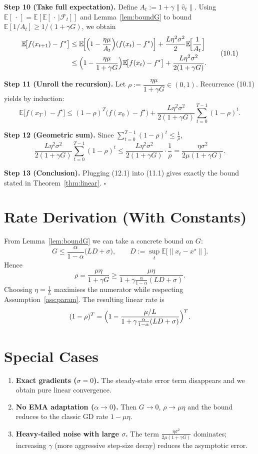 \documentclass{article}
\newcommand{\E}{\mathbb{E}}
\begin{document}
\noindent\textbf{Step 10 (Take full expectation).}  
Define $A_{t}:=1+\gamma\|\widehat v_{t}\|$. Using $\E[\,\cdot\,]=\E[\E[\,\cdot\,|\mathcal{F}_{t}]]$ and Lemma~\ref{lem:boundG} to bound $\E[1/A_{t}]\ge 1/(1+\gamma G)$, we obtain
\[
\begin{aligned}
    \E\!\bigl[f(x_{t+1})-f^{\star}\bigr]
    &\le \E\!\Bigl[\Bigl(1-\frac{\eta\mu}{A_{t}}\Bigr)(f(x_{t})-f^{\star})\Bigr]
        +\frac{L\eta^{2}\sigma^{2}}{2}\E\!\Bigl[\frac{1}{A_{t}}\Bigr]\\
    &\le \Bigl(1-\frac{\eta\mu}{1+\gamma G}\Bigr)\E\!\bigl[f(x_{t})-f^{\star}\bigr]
        +\frac{L\eta^{2}\sigma^{2}}{2(1+\gamma G)} .
\end{aligned}
\tag{10.1}
\]

\noindent\textbf{Step 11 (Unroll the recursion).}  
Let $\rho:=\dfrac{\eta\mu}{1+\gamma G}\in(0,1)$. Recurrence (10.1) yields by induction:
\[
    \E\!\bigl[f(x_{T})-f^{\star}\bigr]
    \le (1-\rho)^{T}\bigl(f(x_{0})-f^{\star}\bigr)
        +\frac{L\eta^{2}\sigma^{2}}{2(1+\gamma G)}\sum_{t=0}^{T-1}(1-\rho)^{t}.
\tag{11.1}
\]

\noindent\textbf{Step 12 (Geometric sum).}  
Since $\sum_{t=0}^{T-1}(1-\rho)^{t}\le \frac{1}{\rho}$,
\[
    \frac{L\eta^{2}\sigma^{2}}{2(1+\gamma G)}\sum_{t=0}^{T-1}(1-\rho)^{t}
    \le \frac{L\eta^{2}\sigma^{2}}{2(1+\gamma G)}\cdot\frac{1}{\rho}
    =\frac{\eta\sigma^{2}}{2\mu(1+\gamma G)} .
\tag{12.1}
\]

\noindent\textbf{Step 13 (Conclusion).}  
Plugging (12.1) into (11.1) gives exactly the bound stated in Theorem~\ref{thm:linear}. $\square$

\section*{Rate Derivation (With Constants)}
From Lemma~\ref{lem:boundG} we can take a concrete bound on $G$:
\[
    G\le \frac{\alpha}{1-\alpha}\bigl(LD+\sigma\bigr),\qquad
    D:=\sup_{t}\E\!\bigl[\|x_{t}-x^{\star}\|\bigr].
\]
Hence
\[
    \rho = \frac{\mu\eta}{1+\gamma G}
    \ge \frac{\mu\eta}{1+\gamma\frac{\alpha}{1-\alpha}(LD+\sigma)} .
\]
Choosing $\eta=\frac{1}{L}$ maximises the numerator while respecting Assumption~\ref{ass:param}. The resulting linear rate is
\[
    (1-\rho)^{T}= \Bigl(1-\frac{\mu/L}{1+\gamma\frac{\alpha}{1-\alpha}(LD+\sigma)}\Bigr)^{T}.
\]

\section*{Special Cases}
\begin{enumerate}
    \item \textbf{Exact gradients ($\sigma=0$).} The steady‑state error term disappears and we obtain pure linear convergence.
    \item \textbf{No EMA adaptation ($\alpha\to0$).} Then $G\to0$, $\rho\to\mu\eta$ and the bound reduces to the classic GD rate $1-\mu\eta$.
    \item \textbf{Heavy‑tailed noise with large $\sigma$.} The term $\frac{\eta\sigma^{2}}{2\mu(1+\gamma G)}$ dominates; increasing $\gamma$ (more aggressive step‑size decay) reduces the asymptotic error.
\end{enumerate}
\end{document}
